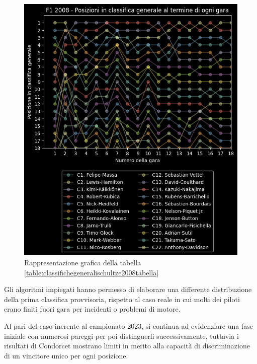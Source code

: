 \documentclass[12pt,a4paper,openright,twoside]{book}
\begin{document}
\begin{figure}[H]
    \centering
     \includegraphics[scale=1.0]{figures/schultzestandings2008.png}
     \caption{Rappresentazione grafica della tabella \ref{table:classifichegeneralischultze2008tabella} }
     \label{fig:classifichegeneralischultze2008figura}
 \end{figure}
 
 Gli algoritmi impiegati hanno permesso di elaborare una differente distribuzione della prima classifica provvisoria,
 rispetto al caso reale in cui molti dei piloti erano finiti fuori gara per incidenti o problemi di motore.

 Al pari del caso inerente al campionato 2023, si continua ad evidenziare una fase iniziale 
 con numerosi pareggi per poi distinguerli successivamente, tuttavia i risultati di Condorcet mostrano limiti in merito alla capacità
 di discriminazione di un vincitore unico per ogni posizione.
\end{document}
